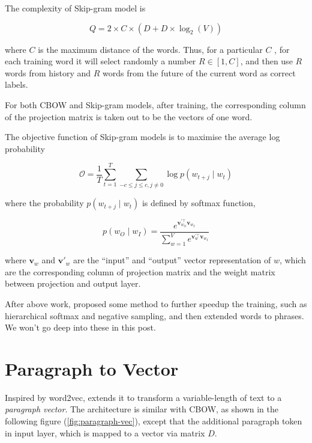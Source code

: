 \documentclass[]{article}
\begin{document}
The complexity of Skip-gram model is

\[
Q = 2 \times C \times (D + D \times \log_2(V))
\]

where \(C\) is the maximum distance of the words. Thus, for a particular
\(C\) , for each training word it will select randomly a number
\(R \in [1, C]\), and then use \(R\) words from history and \(R\) words
from the future of the current word as correct labels.

For both CBOW and Skip-gram models, after training, the corresponding
column of the projection matrix is taken out to be the vectors of one
word.

The objective function of Skip-gram models is to maximise the average
log probability

\begin{equation}
\mathcal{O} = \frac{1}{T}\sum_{t=1}^{T} \sum_{-c \leq j \leq c, j \neq 0} \log p(w_{t+j} \mathop{|} w_t)
\end{equation}

where the probability \(p(w_{t+j} \mathop{|} w_t)\) is defined by
softmax function,

\begin{equation}
p(w_{O} \mathop{|} w_I) = \frac{e^{\mathbf{v}^{'\top}_{w_O} \mathbf{v}_{w_I}}}{\sum_{w=1}^V e^{\mathbf{v}^{'\top}_w \mathbf{v}_{w_I}}}
\end{equation}

where \(\mathbf{v}_w\) and \(\mathbf{v}'_w\) are the ``input'' and
``output'' vector representation of \(w\), which are the corresponding
column of projection matrix and the weight matrix between projection and
output layer.

After above work, \cite{mikolov2013distributed} proposed some method to
further speedup the training, such as hierarchical softmax and negative
sampling, and then extended words to phrases. We won't go deep into
these in this post.

\section{Paragraph to Vector}\label{paragraph-to-vector}

Inspired by word2vec, \cite{le2014distributed} extends it to transform a
variable-length of text to a \emph{paragraph vector}. The architecture
is similar with CBOW, as shown in the following figure
(\autoref{fig:paragraph-vec}), except that the additional paragraph
token in input layer, which is mapped to a vector via matrix \(D\).
\end{document}
